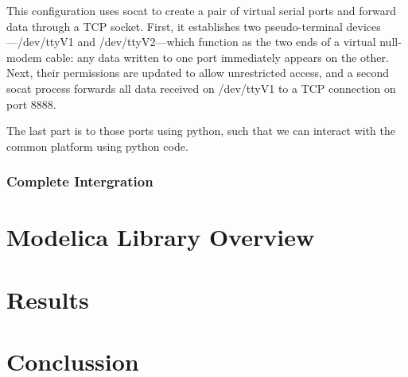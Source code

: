 \documentclass[we,final,11pt,oneside,openany]{uantwerpenbamathesis}
\begin{document}
This configuration uses socat to create a pair of virtual serial ports and forward data through a TCP socket.
First, it establishes two pseudo-terminal devices—/dev/ttyV1 and /dev/ttyV2—which function as the two ends of a virtual null-modem cable: any data written to one port immediately appears on the other.
Next, their permissions are updated to allow unrestricted access, and a second socat process forwards all data received on /dev/ttyV1 to a TCP connection on port 8888.

The last part is to those ports using python, such that we can interact with the common platform using python code.


\subsection{Complete Intergration}
\label{subsec:complete-integration}

\chapter{Modelica Library Overview}
\label{ch:modelica-library-overview}


\chapter{Results}
\label{ch:results}

\chapter{Conclussion}
\label{ch:conclussion}

\appendix



\end{document}
